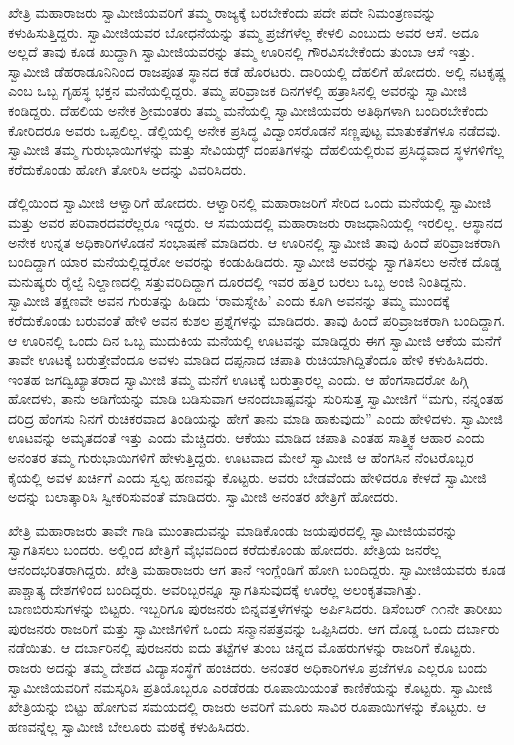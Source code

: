  ಖೇತ್ರಿ ಮಹಾರಾಜರು ಸ್ವಾಮೀಜಿಯವರಿಗೆ ತಮ್ಮ ರಾಜ್ಯಕ್ಕೆ ಬರಬೇಕೆಂದು ಪದೇ ಪದೇ ನಿಮಂತ್ರಣವನ್ನು ಕಳುಹಿಸುತ್ತಿದ್ದರು. ಸ್ವಾಮೀಜಿಯವರ ಬೋಧನೆಯನ್ನು ತಮ್ಮ ಪ್ರಜೆಗಳೆಲ್ಲ ಕೇಳಲಿ ಎಂಬುದು ಅವರ ಆಸೆ. ಅದೂ ಅಲ್ಲದೆ ತಾವು ಕೂಡ ಖುದ್ದಾಗಿ ಸ್ವಾಮೀಜಿಯವರನ್ನು ತಮ್ಮ ಊರಿನಲ್ಲಿ ಗೌರವಿಸಬೇಕೆಂದು ತುಂಬಾ ಆಸೆ ಇತ್ತು. ಸ್ವಾಮೀಜಿ ಡೆಹರಾಡೂನಿನಿಂದ ರಾಜಪೂತ ಸ್ಥಾನದ ಕಡೆ ಹೊರಟರು. ದಾರಿಯಲ್ಲಿ ದೆಹಲಿಗೆ ಹೋದರು. ಅಲ್ಲಿ ನಟಕೃಷ್ಣ ಎಂಬ ಒಬ್ಬ ಗೃಹಸ್ಥ ಭಕ್ತನ ಮನೆಯಲ್ಲಿದ್ದರು. ತಮ್ಮ ಪರಿವ್ರಾಜಕ ದಿನಗಳಲ್ಲಿ ಹತ್ರಾಸಿನಲ್ಲಿ ಅವರನ್ನು ಸ್ವಾಮೀಜಿ ಕಂಡಿದ್ದರು. ದೆಹಲಿಯ ಅನೇಕ ಶ‍್ರೀಮಂತರು ತಮ್ಮ ಮನೆಯಲ್ಲಿ ಸ್ವಾಮೀಜಿಯವರು ಅತಿಥಿಗಳಾಗಿ ಬಂದಿರಬೇಕೆಂದು ಕೋರಿದರೂ ಅವರು ಒಪ್ಪಲಿಲ್ಲ. ಡೆಲ್ಲಿಯಲ್ಲಿ ಅನೇಕ ಪ್ರಸಿದ್ಧ ವಿದ್ವಾಂಸರೊಡನೆ ಸಣ್ಣಪುಟ್ಟ ಮಾತುಕತೆಗಳೂ ನಡೆದವು. ಸ್ವಾಮೀಜಿ ತಮ್ಮ ಗುರುಭಾಯಿಗಳನ್ನು ಮತ್ತು ಸೇವಿಯರ್ಸ್‍‍ ದಂಪತಿಗಳನ್ನು ದೆಹಲಿಯಲ್ಲಿರುವ ಪ್ರಸಿದ್ಧವಾದ ಸ್ಥಳಗಳಿಗೆಲ್ಲ ಕರೆದುಕೊಂಡು ಹೋಗಿ ತೋರಿಸಿ ಅದನ್ನು ವಿವರಿಸಿದರು. 

 ಡೆಲ್ಲಿಯಿಂದ ಸ್ವಾಮೀಜಿ ಆಳ್ವಾರಿಗೆ ಹೋದರು. ಆಳ್ವಾರಿನಲ್ಲಿ ಮಹಾರಾಜರಿಗೆ ಸೇರಿದ ಒಂದು ಮನೆಯಲ್ಲಿ ಸ್ವಾಮೀಜಿ ಮತ್ತು ಅವರ ಪರಿವಾರದವರೆಲ್ಲರೂ ಇದ್ದರು. ಆ ಸಮಯದಲ್ಲಿ ಮಹಾರಾಜರು ರಾಜಧಾನಿಯಲ್ಲಿ ಇರಲಿಲ್ಲ. ಆಸ್ಥಾನದ ಅನೇಕ ಉನ್ನತ ಅಧಿಕಾರಿಗಳೊಡನೆ ಸಂಭಾಷಣೆ ಮಾಡಿದರು. ಆ ಊರಿನಲ್ಲಿ ಸ್ವಾಮೀಜಿ ತಾವು ಹಿಂದೆ ಪರಿವ್ರಾಜಕರಾಗಿ ಬಂದಿದ್ದಾಗ ಯಾರ ಮನೆಯಲ್ಲಿದ್ದರೋ ಅವರನ್ನು ಕಂಡುಹಿಡಿದರು. ಸ್ವಾಮೀಜಿ ಅವರನ್ನು ಸ್ವಾಗತಿಸಲು ಅನೇಕ ದೊಡ್ಡ ಮನುಷ್ಯರು ರೈಲ್ವೆ ನಿಲ್ದಾಣದಲ್ಲಿ ಸತ್ತುವರಿದಿದ್ದಾಗ ದೂರದಲ್ಲಿ ಇವರ ಹತ್ತಿರ ಬರಲು ಒಬ್ಬ ಅಂಜಿ ನಿಂತಿದ್ದನು. ಸ್ವಾಮೀಜಿ ತಕ್ಷಣವೇ ಅವನ ಗುರುತನ್ನು ಹಿಡಿದು ‘ರಾಮಸ್ನೇಹಿ’ ಎಂದು ಕೂಗಿ ಅವನನ್ನು ತಮ್ಮ ಮುಂದಕ್ಕೆ ಕರೆದುಕೊಂಡು ಬರುವಂತೆ ಹೇಳಿ ಅವನ ಕುಶಲ ಪ್ರಶ್ನೆಗಳನ್ನು ಮಾಡಿದರು. ತಾವು ಹಿಂದೆ ಪರಿವ್ರಾಜಕರಾಗಿ ಬಂದಿದ್ದಾಗ. ಆ ಊರಿನಲ್ಲಿ ಒಂದು ದಿನ ಒಬ್ಬ ಮುದುಕಿಯ ಮನೆಯಲ್ಲಿ ಊಟವನ್ನು ಮಾಡಿದ್ದರು ಈಗ ಸ್ವಾಮೀಜಿ ಆಕೆಯ ಮನೆಗೆ ತಾವೇ ಊಟಕ್ಕೆ ಬರುತ್ತೇವೆಂದೂ ಅವಳು ಮಾಡಿದ ದಪ್ಪನಾದ ಚಪಾತಿ ರುಚಿಯಾಗಿದ್ದಿತೆಂದೂ ಹೇಳಿ ಕಳುಹಿಸಿದರು. ಇಂತಹ ಜಗದ್ವಿಖ್ಯಾತರಾದ ಸ್ವಾಮೀಜಿ ತಮ್ಮ ಮನೆಗೆ ಊಟಕ್ಕೆ ಬರುತ್ತಾರಲ್ಲ ಎಂದು. ಆ ಹೆಂಗಸಾದರೋ ಹಿಗ್ಗಿ ಹೋದಳು, ತಾನು ಅಡಿಗೆಯನ್ನು ಮಾಡಿ ಬಡಿಸುವಾಗ ಆನಂದಬಾಷ್ಪವನ್ನು ಸುರಿಸುತ್ತ ಸ್ವಾಮೀಜಿಗೆ “ಮಗು, ನನ್ನಂತಹ ದರಿದ್ರ ಹೆಂಗಸು ನಿನಗೆ ರುಚಿಕರವಾದ ತಿಂಡಿಯನ್ನು ಹೇಗೆ ತಾನು ಮಾಡಿ ಹಾಕುವುದು” ಎಂದು ಹೇಳಿದಳು. ಸ್ವಾಮೀಜಿ ಊಟವನ್ನು ಅಮೃತದಂತೆ ಇತ್ತು ಎಂದು ಮೆಚ್ಚಿದರು. ಆಕೆಯು ಮಾಡಿದ ಚಪಾತಿ ಎಂತಹ ಸಾತ್ತ್ವಿಕ ಆಹಾರ ಎಂದು ಅನಂತರ ತಮ್ಮ ಗುರುಭಾಯಿಗಳಿಗೆ ಹೇಳುತ್ತಿದ್ದರು. ಊಟವಾದ ಮೇಲೆ ಸ್ವಾಮೀಜಿ ಆ ಹೆಂಗಸಿನ ನೆಂಟರೊಬ್ಬರ ಕೈಯಲ್ಲಿ ಅವಳ ಖರ್ಚಿಗೆ ಎಂದು ಸ್ವಲ್ಪ ಹಣವನ್ನು ಕೊಟ್ಟರು. ಅವರು ಬೇಡವೆಂದು ಹೇಳಿದರೂ ಕೇಳದೆ ಸ್ವಾಮೀಜಿ ಅದನ್ನು ಬಲಾತ್ಕಾರಿಸಿ ಸ್ವೀಕರಿಸುವಂತೆ ಮಾಡಿದರು. ಸ್ವಾಮೀಜಿ ಅನಂತರ ಖೇತ್ರಿಗೆ ಹೋದರು. 

 ಖೇತ್ರಿ ಮಹಾರಾಜರು ತಾವೇ ಗಾಡಿ ಮುಂತಾದುವನ್ನು ಮಾಡಿಕೊಂಡು ಜಯಪುರದಲ್ಲಿ ಸ್ವಾಮೀಜಿಯವರನ್ನು ಸ್ವಾಗತಿಸಲು ಬಂದರು. ಅಲ್ಲಿಂದ ಖೇತ್ರಿಗೆ ವೈಭವದಿಂದ ಕರೆದುಕೊಂಡು ಹೋದರು. ಖೇತ್ರಿಯ ಜನರೆಲ್ಲ ಆನಂದಭರಿತರಾಗಿದ್ದರು. ಖೇತ್ರಿ ಮಹಾರಾಜರು ಆಗ ತಾನೆ ಇಂಗ್ಲೆಂಡಿಗೆ ಹೋಗಿ ಬಂದಿದ್ದರು. ಸ್ವಾಮೀಜಿಯವರು ಕೂಡ ಪಾಶ್ಚಾತ್ಯ ದೇಶಗಳಿಂದ ಬಂದಿದ್ದರು. ಅವರಿಬ್ಬರನ್ನೂ ಸ್ವಾಗತಿಸುವುದಕ್ಕೆ ಊರೆಲ್ಲ ಅಲಂಕೃತವಾಗಿತ್ತು. ಬಾಣಬಿರುಸುಗಳನ್ನು ಬಿಟ್ಟರು. ಇಬ್ಬರಿಗೂ ಪುರಜನರು ಬಿನ್ನವತ್ತಳೆಗಳನ್ನು ಅರ್ಪಿಸಿದರು. ಡಿಸೆಂಬರ್ ೧೧ನೇ ತಾರೀಖು ಪುರಜನರು ರಾಜರಿಗೆ ಮತ್ತು ಸ್ವಾಮೀಜಿಗಳಿಗೆ ಒಂದು ಸನ್ಮಾನಪತ್ರವನ್ನು ಒಪ್ಪಿಸಿದರು. ಆಗ ದೊಡ್ಡ ಒಂದು ದರ್ಬಾರು ನಡೆಯಿತು. ಆ ದರ್ಬಾರಿನಲ್ಲಿ ಪುರಜನರು ಐದು ತಟ್ಟೆಗಳ ತುಂಬ ಚಿನ್ನದ ಮೊಹರುಗಳನ್ನು ರಾಜರಿಗೆ ಕೊಟ್ಟರು. ರಾಜರು ಅದನ್ನು ತಮ್ಮ ದೇಶದ ವಿದ್ಯಾಸಂಸ್ಥೆಗೆ ಹಂಚಿದರು. ಅನಂತರ ಅಧಿಕಾರಿಗಳೂ ಪ್ರಜೆಗಳೂ ಎಲ್ಲರೂ ಬಂದು ಸ್ವಾಮೀಜಿಯವರಿಗೆ ನಮಸ್ಕರಿಸಿ ಪ್ರತಿಯೊಬ್ಬರೂ ಎರಡೆರಡು ರೂಪಾಯಿಯಂತೆ ಕಾಣಿಕೆಯನ್ನು ಕೊಟ್ಟರು. ಸ್ವಾಮೀಜಿ ಖೇತ್ರಿಯನ್ನು ಬಿಟ್ಟು ಹೋಗುವ ಸಮಯದಲ್ಲಿ ರಾಜರು ಅವರಿಗೆ ಮೂರು ಸಾವಿರ ರೂಪಾಯಿಗಳನ್ನು ಕೊಟ್ಟರು. ಆ ಹಣವನ್ನೆಲ್ಲ ಸ್ವಾಮೀಜಿ ಬೇಲೂರು ಮಠಕ್ಕೆ ಕಳುಹಿಸಿದರು. 

